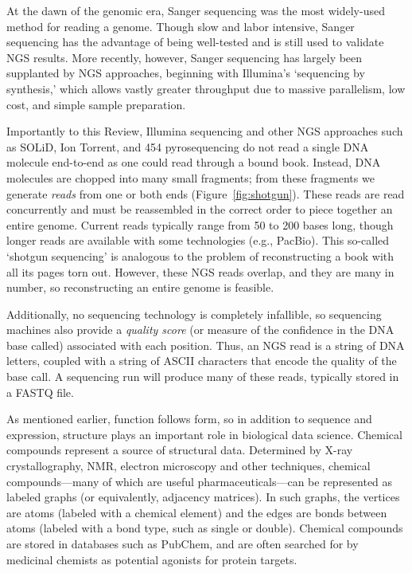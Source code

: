 \documentclass{acm_proc_article-sp}
\begin{document}
At the dawn of the genomic era, Sanger sequencing was the most widely-used 
method for reading a genome.
Though slow and labor intensive, Sanger sequencing has the advantage of being
well-tested and is still used to validate NGS results.
More recently, however, Sanger sequencing has largely been supplanted by NGS approaches,
beginning with Illumina's `sequencing by synthesis,' which allows vastly 
greater throughput due to massive parallelism, low cost, and simple sample
preparation.

Importantly to this Review, Illumina sequencing and other NGS approaches
such as SOLiD, Ion Torrent, and 454 pyrosequencing do not read a single DNA
molecule end-to-end as one could read through a bound book.
Instead, DNA molecules are chopped into many small fragments;
from these fragments we generate 
\emph{reads} from one or both ends (Figure~\ref{fig:shotgun}).
These reads are read concurrently and must be reassembled in the correct order 
to piece together an entire genome.
Current reads typically range from 50 to 200 bases long, though longer reads are
available with some technologies (e.g., PacBio).
This so-called `shotgun sequencing' is analogous to the problem of 
reconstructing a book with all its pages torn out.
However, these NGS reads overlap, and they are many in number, so 
reconstructing an entire genome is feasible.

Additionally, no sequencing technology is completely infallible, so sequencing machines also
provide a \emph{quality score} (or measure of the confidence in the DNA base
called) associated with each position.
Thus, an NGS read is a string of DNA letters, coupled with a string of ASCII
characters that encode the quality of the base call.
A sequencing run will produce many of these reads, typically stored in a FASTQ
file.

As mentioned earlier, function follows form, so in addition to
sequence and expression, structure plays an important role in biological data science.
Chemical compounds represent a source of structural data.
Determined by X-ray crystallography, NMR, electron microscopy and other 
techniques, chemical compounds---many of which are useful pharmaceuticals---can be
represented as labeled graphs (or equivalently, adjacency matrices).
In such graphs, the vertices are atoms (labeled with a chemical element) and
the edges are bonds between atoms (labeled with a bond type, such as single or
double).
Chemical compounds are stored in databases such as PubChem, and are often searched
for by medicinal chemists as potential agonists for protein targets.
\end{document}

